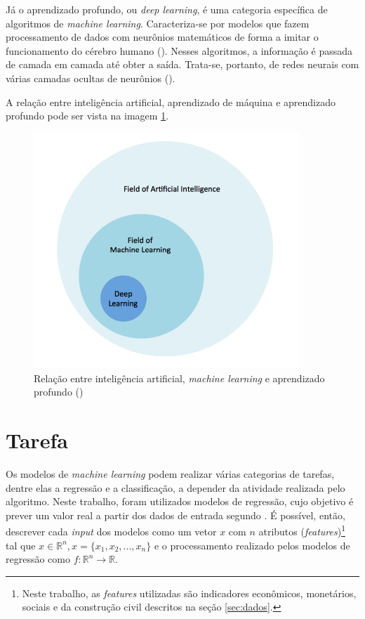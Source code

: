 Já o aprendizado profundo, ou \textit{deep learning}, é uma 
categoria específica de algoritmos de \textit{machine learning}. 
Caracteriza-se por 
modelos que fazem processamento de dados com neurônios 
matemáticos de forma a imitar o 
funcionamento do cérebro humano (\cite{deeplearningbook}). Nesses algoritmos, a informação
é passada de camada em camada até obter a saída. Trata-se, portanto,
de redes neurais com várias camadas ocultas de neurônios (\cite{d2l}). 

A relação entre inteligência artificial, aprendizado de 
máquina e aprendizado profundo pode ser vista na 
imagem \ref{fig:ia_ml}.

\begin{figure}[H] 
  \includegraphics[width= 10cm]{../figuras/ia_ml.png}
  \caption{Relação entre inteligência artificial, \textit{machine learning} e aprendizado profundo (\cite{dl-oreilly})}
  \label{fig:ia_ml}
\end{figure}

\section{Tarefa}
 
Os modelos de \textit{machine learning} podem realizar várias categorias 
de tarefas, dentre elas a regressão e a classificação, a 
depender da atividade realizada pelo algoritmo.
Neste trabalho,  foram utilizados modelos de regressão, cujo objetivo é prever um valor real a 
partir dos dados de entrada segundo \citet{Goodfellow-et-al-2016}.
É possível, então, descrever cada \textit{input} dos modelos como um vetor $x$ com 
$n$ atributos (\textit{features})\footnote{Neste trabalho, 
as \textit{features} utilizadas são indicadores econômicos, monetários,
sociais e da construção civil descritos na seção \ref{sec:dados}.} tal que
$x \in \mathbb{R}^n , x=\{x_1, x_2, ..., x_n\}$ e o 
processamento realizado pelos modelos de regressão como $ f : \mathbb{R}^n \rightarrow \mathbb{R}$. 

